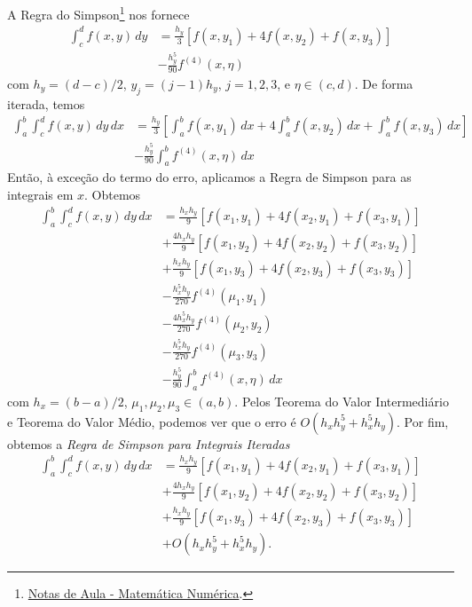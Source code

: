 A Regra do Simpson\footnote{\href{https://phkonzen.github.io/notas/MatematicaNumerica/cap_integr_sec_NC.html}{Notas de Aula - Matemática Numérica}.} nos fornece
\begin{align}
  \int_c^d f(x,y)\,dy &= \frac{h_y}{3}\left[f(x,y_1) + 4f(x,y_2) + f(x,y_3)\right] \\
                      &- \frac{h_y^5}{90}f^{(4)}(x,\eta)
\end{align}
com $h_y = (d-c)/2$, $y_j=(j-1)h_y$, $j=1,2,3$, e $\eta\in (c,d)$. De forma iterada, temos
\begin{align}
  \int_a^b\int_c^d f(x,y)\,dy\,dx &= \frac{h_y}{3}\left[\int_a^bf(x,y_1)\,dx + 4\int_a^bf(x,y_2)\,dx + \int_a^bf(x,y_3)\,dx\right] \\
                                  &- \frac{h_y^5}{90}\int_a^bf^{(4)}(x,\eta)\,dx
\end{align}
Então, à exceção do termo do erro, aplicamos a Regra de Simpson para as integrais em $x$. Obtemos
\begin{align}
  \int_a^b\int_c^d f(x,y)\,dy\,dx &= \frac{h_xh_y}{9}\left[f(x_1,y_1) + 4f(x_2,y_1) + f(x_3,y_1)\right] \\
                                  &+ \frac{4h_xh_y}{9}\left[f(x_1,y_2) + 4f(x_2,y_2) + f(x_3,y_2)\right] \\
                                  &+ \frac{h_xh_y}{9}\left[f(x_1,y_3) + 4f(x_2,y_3) + f(x_3,y_3)\right] \\
                                  &- \frac{h_x^5h_y}{270}f^{(4)}(\mu_1,y_1)\\
                                  &- \frac{4h_x^5h_y}{270}f^{(4)}(\mu_2,y_2)\\
                                  &- \frac{h_x^5h_y}{270}f^{(4)}(\mu_3,y_3) \\
                                  &- \frac{h_y^5}{90}\int_a^bf^{(4)}(x,\eta)\,dx
\end{align}
com $h_x = (b-a)/2$, $\mu_1,\mu_2,\mu_3\in (a,b)$. Pelos Teorema do Valor Intermediário e Teorema do Valor Médio, podemos ver que o erro é $O(h_xh_y^5 + h_x^5h_y)$. Por fim, obtemos a \emph{Regra de Simpson para Integrais Iteradas}
\begin{align}
  \int_a^b\int_c^d f(x,y)\,dy\,dx &= \frac{h_xh_y}{9}\left[f(x_1,y_1) + 4f(x_2,y_1) + f(x_3,y_1)\right] \\
                                  &+ \frac{4h_xh_y}{9}\left[f(x_1,y_2) + 4f(x_2,y_2) + f(x_3,y_2)\right] \\
                                  &+ \frac{h_xh_y}{9}\left[f(x_1,y_3) + 4f(x_2,y_3) + f(x_3,y_3)\right] \\
                                  &+ O(h_xh_y^5 + h_x^5h_y).
\end{align}

